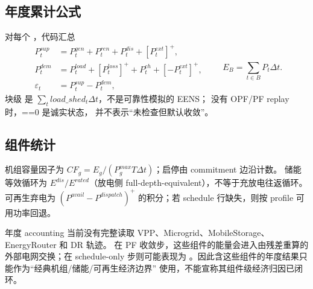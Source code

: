 \subsection{年度累计公式}
对每个 ，代码汇总
\[
\begin{aligned}
P^{sup}_t&=P^{gen}_t+P^{ren}_t+P^{dis}_t+[P^{ext}_t]^+,\\
P^{dem}_t&=P^{load}_t+[P^{loss}_t]^++P^{ch}_t+[-P^{ext}_t]^+,\\
\varepsilon_t&=P^{sup}_t-P^{dem}_t,
\end{aligned}
\qquad
E_B=\sum_{t\in B}P_t\Delta t.
\]
块级  是 $\sum_t load\_shed_t\Delta t$，不是可靠性模拟的 EENS；
没有 OPF/PF replay 时，==0 是诚实状态，
并不表示“未检查但默认收敛”。

\subsection{组件统计}
机组容量因子为 $CF_g=E_g/(P_g^{max}T\Delta t)$；启停由 commitment 边沿计数。
储能等效循环为 $E^{dis}/E^{rated}$（放电侧 full-depth-equivalent），不等于充放电往返循环。
可再生弃电为 $(P^{avail}-P^{dispatch})^+$ 的积分；若 schedule 行缺失，则按 profile 可用功率回退。

\begin{gapnote}
年度 accounting 当前没有完整读取 VPP、Microgrid、MobileStorage、EnergyRouter 和 DR 轨迹。
在 PF 收敛步，这些组件的能量会进入由残差重算的外部电网交换；在 schedule-only 步则可能表现为
。因此含这些组件的年度结果只能作为“经典机组/储能/可再生经济边界”
使用，不能宣称其组件级经济归因已闭环。
\end{gapnote}
